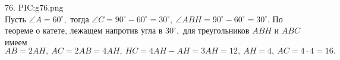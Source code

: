 76. {{PIC:g76.png}}\\
Пусть $\angle A=60^\circ,$ тогда $\angle C=90^\circ-60^\circ=30^\circ,\ \angle ABH=90^\circ-60^\circ=30^\circ.$ По теореме о катете, лежащем напротив угла в $30^\circ,$ для треугольников $ABH$ и $ABC$ имеем $AB=2AH,\ AC=2AB=4AH,\ HC=4AH-AH=3AH=12,\ AH=4,\ AC=4\cdot4=16.$\\
